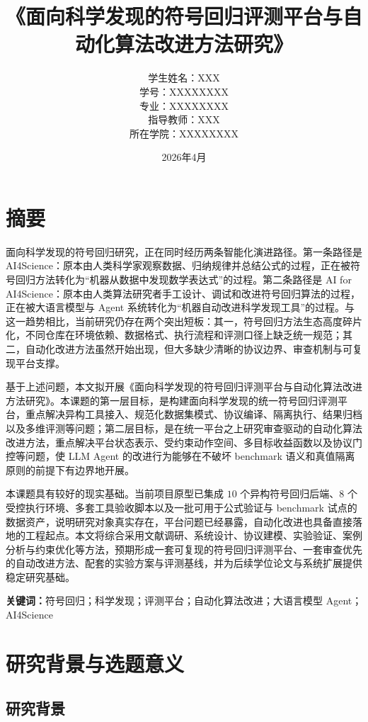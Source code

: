 \documentclass[UTF8,12pt]{ctexart}
\title{\textbf{《面向科学发现的符号回归评测平台与自动化算法改进方法研究》}}
\author{
学生姓名：XXX \\
学\hspace{1.5em}号：XXXXXXXX \\
专\hspace{1.5em}业：XXXXXXXX \\
指导教师：XXX \\
所在学院：XXXXXXXX
}
\date{2026年4月}
\begin{document}
\maketitle

\section*{摘要}

面向科学发现的符号回归研究，正在同时经历两条智能化演进路径。第一条路径是 AI4Science：原本由人类科学家观察数据、归纳规律并总结公式的过程，正在被符号回归方法转化为“机器从数据中发现数学表达式”的过程。第二条路径是 AI for AI4Science：原本由人类算法研究者手工设计、调试和改进符号回归算法的过程，正在被大语言模型与 Agent 系统转化为“机器自动改进科学发现工具”的过程。与这一趋势相比，当前研究仍存在两个突出短板：其一，符号回归方法生态高度碎片化，不同仓库在环境依赖、数据格式、执行流程和评测口径上缺乏统一规范；其二，自动化改进方法虽然开始出现，但大多缺少清晰的协议边界、审查机制与可复现平台支撑。

基于上述问题，本文拟开展《面向科学发现的符号回归评测平台与自动化算法改进方法研究》。本课题的第一层目标，是构建面向科学发现的统一符号回归评测平台，重点解决异构工具接入、规范化数据集模式、协议编译、隔离执行、结果归档以及多维评测等问题；第二层目标，是在统一平台之上研究审查驱动的自动化算法改进方法，重点解决平台状态表示、受约束动作空间、多目标收益函数以及协议门控等问题，使 LLM Agent 的改进行为能够在不破坏 benchmark 语义和真值隔离原则的前提下有边界地开展。

本课题具有较好的现实基础。当前项目原型已集成 $10$ 个异构符号回归后端、$8$ 个受控执行环境、多套工具验收脚本以及一批可用于公式验证与 benchmark 试点的数据资产，说明研究对象真实存在，平台问题已经暴露，自动化改进也具备直接落地的工程起点。本文将综合采用文献调研、系统设计、协议建模、实验验证、案例分析与约束优化等方法，预期形成一套可复现的符号回归评测平台、一套审查优先的自动改进方法、配套的实验方案与评测基线，并为后续学位论文与系统扩展提供稳定研究基础。

\noindent\textbf{关键词：}符号回归；科学发现；评测平台；自动化算法改进；大语言模型 Agent；AI4Science

\clearpage
\tableofcontents
\clearpage

\section{研究背景与选题意义}

\subsection{研究背景}
\end{document}
